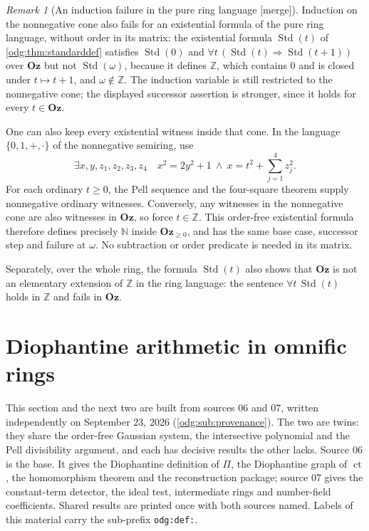 \documentclass[11pt,oneside]{article}
\numberwithin{equation}{section}
\theoremstyle{definition}
\theoremstyle{remark}
\newtheorem{remark}[remark]{Remark}
\newcommand{\Oz}{\mathbf{Oz}}
\newcommand{\Z}{\mathbb Z}
\newcommand{\N}{\mathbb N}
\newcommand{\ct}{\operatorname{ct}}
\newcommand{\Std}{\operatorname{Std}}
\newcommand{\mergetag}{\textup{\textsf{\small[merge]}}}
\newcommand{\fn}[1]{\nolinkurl{#1}}
\begin{document}
\begin{remark}[An induction failure in the pure ring language \mergetag]\label{odg:rem:ringinduction}
Induction on the nonnegative cone also fails for an existential formula
of the pure ring language, without order in its matrix:
the existential formula $\Std(t)$ of \cref{odg:thm:standarddef} satisfies
$\Std(0)$ and $\forall t\,(\Std(t)\Rightarrow\Std(t+1))$ over $\Oz$ but not
$\Std(\omega)$, because it defines $\Z$, which contains $0$ and is closed
under $t\mapsto t+1$, and $\omega\notin\Z$. The induction variable is still
restricted to the nonnegative cone; the displayed successor assertion is
stronger, since it holds for every $t\in\Oz$.

One can also keep every existential witness inside that cone. In the
language $\{0,1,+,\cdot\}$ of the nonnegative semiring, use
\[
 \exists x,y,z_1,z_2,z_3,z_4\quad
 x^2=2y^2+1\ \land\ x=t^2+\sum_{j=1}^4 z_j^2.
\]
For each ordinary $t\ge0$, the Pell sequence and the four-square theorem
supply nonnegative ordinary witnesses. Conversely, any witnesses in the
nonnegative cone are also witnesses in $\Oz$, so force $t\in\Z$.
This order-free existential formula therefore defines precisely $\N$
inside $\Oz_{\ge0}$, and has the same base case, successor step and failure
at $\omega$. No subtraction or order predicate is needed in its matrix.

Separately, over the whole ring, the formula
$\Std(t)$ also shows that $\Oz$ is not an elementary extension of $\Z$ in the
ring language: the sentence $\forall t\,\Std(t)$ holds in $\Z$ and fails in
$\Oz$.
\end{remark}

\section{Diophantine arithmetic in omnific rings}\label{odg:def:sec:arithmetic}

This section and the next two are built from sources 06 and 07, written
independently on September 23, 2026 (\cref{odg:sub:provenance}). The two are
twins: they share the order-free Gaussian system, the intersective polynomial
and the Pell divisibility argument, and each has decisive results the other
lacks. Source 06 is the base. It gives the Diophantine definition of $\Pi$,
the Diophantine graph of $\ct$, the homomorphism theorem and the
reconstruction package; source 07 gives the constant-term detector, the ideal
test, intermediate rings and number-field coefficients. Shared results are
printed once with both sources named. Labels of this material carry the
sub-prefix \fn{odg:def:}.
\end{document}
